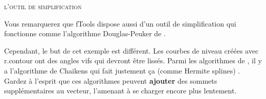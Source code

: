 \begin{Tip}\caption{\textsc{l'outil de simplification}}
Vous remarquerez que fTools dispose aussi d'un outil de simplification  qui fonctionne comme l'algorithme Douglas-Peuker de \grass {}.
\end{Tip}

Cependant, le but de cet exemple est différent. Les courbes de niveau créées avec r.contour ont des angles vifs qui devront être lissés. Parmi les algorithmes de , il y a l'algorithme de Chaikens qui fait justement ça (comme Hermite splines) . Gardez à l'esprit que ces algorithmes peuvent \textbf{ajouter} des sommets supplémentaires au vecteur, l'amenant à se charger encore plus lentement.

